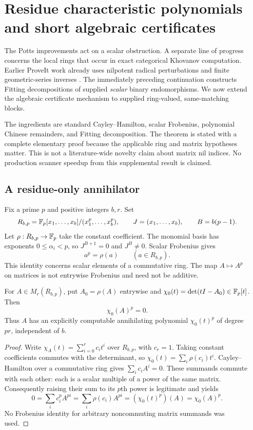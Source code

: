 \section{Residue characteristic polynomials and short algebraic certificates}
\label{sec:residue}

The Potts improvements act on a scalar obstruction. A separate line of
progress concerns the local rings that occur in exact categorical
Khovanov computation. Earlier ProveIt work already uses nilpotent radical
perturbations and finite geometric-series inverses
\cite{report08,report12}. The immediately preceding continuation constructs
Fitting decompositions of supplied \emph{scalar} binary endomorphisms.
We now extend the algebraic certificate mechanism to supplied ring-valued,
same-matching blocks.

The ingredients are standard Cayley--Hamilton, scalar Frobenius, polynomial
Chinese remainders, and Fitting decomposition. The theorem is stated with a
complete elementary proof because the applicable ring and matrix hypotheses
matter. This is not a literature-wide novelty claim about matrix nil indices.
No production scanner speedup from this supplemental result is claimed.

\subsection{A residue-only annihilator}

Fix a prime $p$ and positive integers $b,r$. Set
\[
 R_{b,p}=\mathbb F_p[x_1,\ldots,x_b]/(x_1^p,\ldots,x_b^p),\qquad
 J=(x_1,\ldots,x_b),\qquad B=b(p-1).
\]
Let $\rho:R_{b,p}\to\mathbb F_p$ take the constant coefficient.
The monomial basis has exponents $0\le\alpha_i<p$, so
$J^{B+1}=0$ and $J^B\ne0$. Scalar Frobenius gives
\begin{equation}
 a^p=\rho(a)\qquad(a\in R_{b,p}).
 \label{eq:scalar-frobenius}
\end{equation}
This identity concerns scalar elements of a commutative ring. The map
$A\mapsto A^p$ on matrices is not entrywise Frobenius and need not be additive.

\begin{theorem}
\label{thm:residue}
For $A\in M_r(R_{b,p})$, put $A_0=\rho(A)$ entrywise and
$\chi_0(t)=\det(tI-A_0)\in\mathbb F_p[t]$. Then
\[
 \boxed{\chi_0(A)^p=0.}
\]
Thus $A$ has an explicitly computable annihilating polynomial
$\chi_0(t)^p$ of degree $pr$, independent of $b$.
\end{theorem}
\begin{proof}
Write $\chi_A(t)=\sum_{i=0}^r c_it^i$ over $R_{b,p}$, with $c_r=1$.
Taking constant coefficients commutes with the determinant, so
$\chi_0(t)=\sum_i\rho(c_i)t^i$.
Cayley--Hamilton over a commutative ring gives $\sum_i c_iA^i=0$.
These summands commute with each other: each is a scalar multiple of a
power of the same matrix. Consequently raising their sum to its $p$th power
is legitimate and yields
\[
 0=\sum_i c_i^p A^{pi}
   =\sum_i\rho(c_i)A^{pi}
   =(\chi_0(t)^p)(A)=\chi_0(A)^p.
\]
No Frobenius identity for arbitrary noncommuting matrix summands was used.
\end{proof}

